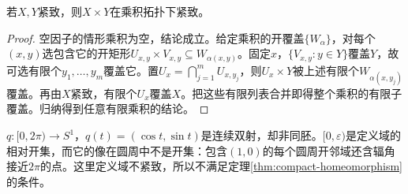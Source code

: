 \begin{theorem}[有限乘积紧致]
若$X,Y$紧致，则$X\times Y$在乘积拓扑下紧致。
\end{theorem}
\begin{proof}
空因子的情形乘积为空，结论成立。给定乘积的开覆盖$\{W_\alpha\}$，对每个$(x,y)$选包含它的开矩形$U_{x,y}\times V_{x,y}\subseteq W_{\alpha(x,y)}$。固定$x$，$\{V_{x,y}:y\in Y\}$覆盖$Y$，故可选有限个$y_1,\ldots,y_m$覆盖它。置$U_x=\bigcap_{j=1}^mU_{x,y_j}$，则$U_x\times Y$被上述有限个$W_{\alpha(x,y_j)}$覆盖。再由$X$紧致，有限个$U_x$覆盖$X$。把这些有限列表合并即得整个乘积的有限子覆盖。归纳得到任意有限乘积的结论。
\end{proof}
\begin{example}[连续双射的限制]
$q:[0,2\pi)\to S^1$，$q(t)=(\cos t,\sin t)$是连续双射，却非同胚。$[0,\varepsilon)$是定义域的相对开集，而它的像在圆周中不是开集：包含$(1,0)$的每个圆周开邻域还含辐角接近$2\pi$的点。这里定义域不紧致，所以不满足定理\ref{thm:compact-homeomorphism}的条件。
\end{example}

